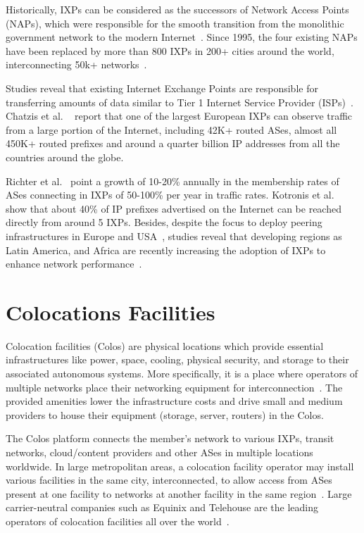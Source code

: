 	Historically, IXPs can be considered as the successors of Network Access Points (NAPs), which were responsible for the smooth transition from the monolithic government network to the modern Internet~\cite{Chatzis:2013}. Since 1995, the four existing NAPs have been replaced by more than 800 IXPs in 200+ cities around the world, interconnecting 50k+ networks~\cite{Ager:2012, Giotsas:2015:MPI:2716281.2836122}.

	Studies reveal that existing Internet Exchange Points are responsible for transferring amounts of data similar to Tier 1 Internet Service Provider (ISPs)~\cite{Ager:2012}. Chatzis et al. ~\cite{Chatzis:2013:BUL:2504730.2504746} report that one of the largest European IXPs can observe traffic from a large portion of the Internet, including 42K+ routed ASes, almost all 450K+ routed prefixes and around a quarter billion IP addresses from all the countries around the globe. 

	Richter et al.~\cite{Richter:2014} point a growth of 10-20\% annually in the membership rates of ASes connecting in IXPs of 50-100\% per year in traffic rates. Kotronis et al.~\cite{Kotronis:2015:IPI:2745844.2745877} show that about 40\% of IP prefixes advertised on the Internet can be reached directly from around 5 IXPs. Besides, despite the focus to deploy peering infrastructures in Europe and USA~\cite{Chatzis:2013, Chatzis:2015:QVO:2717646.2717650}, studies reveal that developing regions as Latin America, and Africa are recently increasing the adoption of IXPs to enhance network performance~\cite{DissectingBrazilianIXP, Fanou:2017:ICC:3131365.3131394}.


	\section{Colocations Facilities}
	\label{subsec:colos}

	Colocation facilities (Colos) are physical locations which provide essential infrastructures like power, space, cooling, physical security, and storage to their associated autonomous systems. More specifically, it is a place where operators of multiple networks place their networking equipment for interconnection~\cite{BITAG}. The provided amenities lower the infrastructure costs and drive small and medium providers to house their equipment (storage, server, routers) in the Colos.

	The Colos platform connects the member's network to various IXPs, transit networks, cloud/content providers and other ASes in multiple locations worldwide. In large metropolitan areas, a colocation facility operator may install various facilities in the same city, interconnected, to allow access from ASes present at one facility to networks at another facility in the same region~\cite{Giotsas:2015:MPI:2716281.2836122}. Large carrier-neutral companies such as Equinix and Telehouse are the leading operators of colocation facilities all over the world~\cite{Kotronis:2017:STC:3131365.3131388}. 

	


	